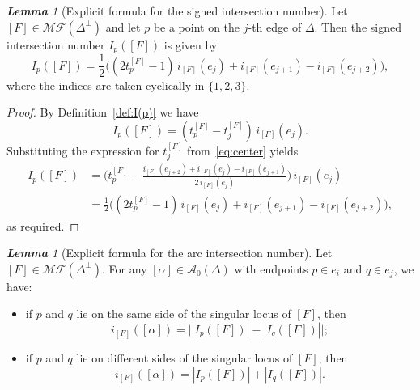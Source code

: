 \documentclass[11pt, letterpaper]{amsart}
\theoremstyle{definition}
\theoremstyle{remark}
\newtheorem{lemma}[theorem]{\rm\bf Lemma}
\newcommand{\cMF}{\mathcal{MF}}
\newcommand{\cA}{\mathcal{A}}
\numberwithin{equation}{section}
\begin{document}
\begin{lemma}[Explicit formula for the signed intersection number]
\label{clm:express.I(p)}
Let $[F]\in\cMF(\Delta^{\perp})$ and let $p$ be a point on the $j$-th edge of
$\Delta$. Then the signed intersection number $I_p([F])$ is given by
\begin{equation}
    I_p([F])
    = \frac{1}{2}\Big( (2t^{[F]}_p-1) \, i_{[F]}(e_j)
                      + i_{[F]}(e_{j+1}) - i_{[F]}(e_{j+2}) \Big),
\end{equation}
where the indices are taken cyclically in $\{1,2,3\}$.
\end{lemma}

\begin{proof}
By Definition~\ref{def:I(p)} we have
\[
    I_p([F]) = (t_p^{[F]} - t_j^{[F]}) \, i_{[F]}(e_j).
\]
Substituting the expression for $t_j^{[F]}$ from~\eqref{eq:center} yields
\begin{align*}
    I_p([F])
    &= \Big( t_p^{[F]}
       - \frac{i_{[F]}(e_{j+2}) + i_{[F]}(e_j) - i_{[F]}(e_{j+1})}
              {2 \, i_{[F]}(e_j)} \Big) \, i_{[F]}(e_j) \\
    &= \frac{1}{2}\Big( (2t_p^{[F]} - 1) \, i_{[F]}(e_j)
                      + i_{[F]}(e_{j+1}) - i_{[F]}(e_{j+2}) \Big),
\end{align*}
as required.
\end{proof}

\begin{lemma}[Explicit formula for the arc intersection number]
\label{clm:arc.inter.triang.}
Let $[F]\in\cMF(\Delta^{\perp})$.
For any $[\alpha]\in\cA_0(\Delta)$ with endpoints $p\in e_i$ and $q\in e_j$,
we have:
\begin{itemize}
\item
if $p$ and $q$ lie on the same side of the singular locus of $[F]$, then
\[
    i_{[F]}([\alpha]) = \big||I_p([F])| - |I_q([F])|\big|;
\]
\item
if $p$ and $q$ lie on different sides of the singular locus of $[F]$, then
\[
    i_{[F]}([\alpha]) = |I_p([F])| + |I_q([F])|.
\]
\end{itemize}
\end{lemma}
\end{document}
